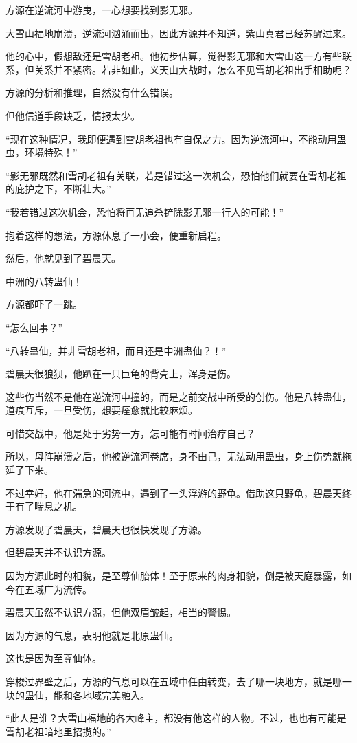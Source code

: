 \begin{this_body}
方源在逆流河中游曳，一心想要找到影无邪。

大雪山福地崩溃，逆流河汹涌而出，因此方源并不知道，紫山真君已经苏醒过来。

他的心中，假想敌还是雪胡老祖。他初步估算，觉得影无邪和大雪山这一方有些联系，但关系并不紧密。若非如此，义天山大战时，怎么不见雪胡老祖出手相助呢？

方源的分析和推理，自然没有什么错误。

但他信道手段缺乏，情报太少。

“现在这种情况，我即便遇到雪胡老祖也有自保之力。因为逆流河中，不能动用蛊虫，环境特殊！”

“影无邪既然和雪胡老祖有关联，若是错过这一次机会，恐怕他们就要在雪胡老祖的庇护之下，不断壮大。”

“我若错过这次机会，恐怕将再无追杀铲除影无邪一行人的可能！”

抱着这样的想法，方源休息了一小会，便重新启程。

然后，他就见到了碧晨天。

中洲的八转蛊仙！

方源都吓了一跳。

“怎么回事？”

“八转蛊仙，并非雪胡老祖，而且还是中洲蛊仙？！”

碧晨天很狼狈，他趴在一只巨龟的背壳上，浑身是伤。

这些伤当然不是他在逆流河中撞的，而是之前交战中所受的创伤。他是八转蛊仙，道痕互斥，一旦受伤，想要痊愈就比较麻烦。

可惜交战中，他是处于劣势一方，怎可能有时间治疗自己？

所以，母阵崩溃之后，他被逆流河卷席，身不由己，无法动用蛊虫，身上伤势就拖延了下来。

不过幸好，他在湍急的河流中，遇到了一头浮游的野龟。借助这只野龟，碧晨天终于有了喘息之机。

方源发现了碧晨天，碧晨天也很快发现了方源。

但碧晨天并不认识方源。

因为方源此时的相貌，是至尊仙胎体！至于原来的肉身相貌，倒是被天庭暴露，如今在五域广为流传。

碧晨天虽然不认识方源，但他双眉皱起，相当的警惕。

因为方源的气息，表明他就是北原蛊仙。

这也是因为至尊仙体。

穿梭过界壁之后，方源的气息可以在五域中任由转变，去了哪一块地方，就是哪一块的蛊仙，能和各地域完美融入。

“此人是谁？大雪山福地的各大峰主，都没有他这样的人物。不过，也也有可能是雪胡老祖暗地里招揽的。”


\end{this_body}
